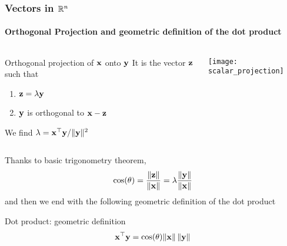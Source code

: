 \begin{frame}
  \frametitle{Vectors in $\mathbb{R}^n$}
  \framesubtitle{Orthogonal Projection and geometric definition of the dot product}

  \begin{columns}
  \begin{column}{.5\textwidth}
  \begin{block}{Orthogonal projection of $\mathbf{x}$ onto $\mathbf{y}$}
    It is the vector $\mathbf{z}$ such that
  \begin{enumerate}
    \item $\mathbf{z} = \lambda \mathbf{y}$
    \item $\mathbf{y}$  is orthogonal to $\mathbf{x} - \mathbf{z}$
  \end{enumerate}
    We find $\lambda =\mathbf{x}^\top \mathbf{y} / \|\mathbf{y} \|^2 $ 
  \end{block}
  \end{column}
  \begin{column}{.5\textwidth}
    \texttt{[image: scalar\_projection]}
  \end{column}
  \end{columns}

  \pause
  Thanks to basic trigonometry theorem, 
  \begin{equation*}
    \cos(\theta) = \frac{\|\mathbf{z}\|}{\|\mathbf{x}\|} = \lambda \frac{\|\mathbf{y}\|}{\|\mathbf{x}\|}
  \end{equation*}
  and then we end with the following geometric definition of the dot product
  
  \begin{block}{Dot product: geometric definition} 
  \vspace{-.35cm}
    \begin{equation*}
      \mathbf{x}^\top \mathbf{y} = \cos (\theta) \| \mathbf{x} \| \,  \| \mathbf{y} \| 
    \end{equation*}
  \end{block}


\end{frame}
